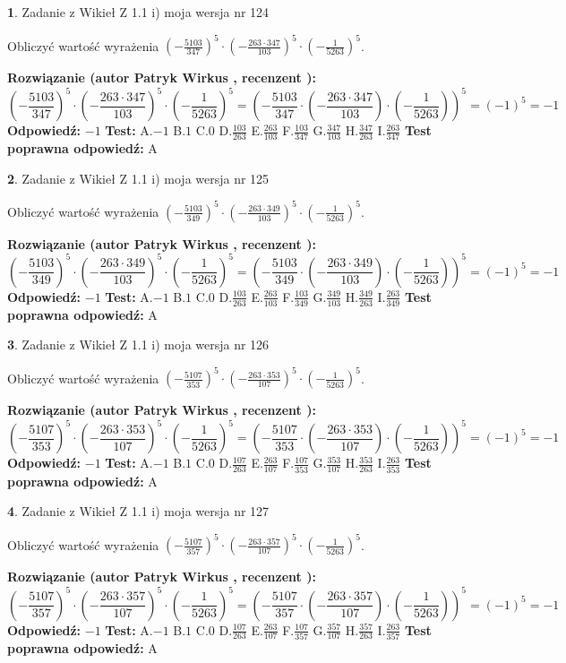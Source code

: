 \documentclass[12pt, a4paper]{article}
\theoremstyle{definition} %
\newtheorem{zad}{}
\newcommand{\zadStart}[1]{\begin{zad}#1\newline}
\newcommand{\zadStop}{\end{zad}}
\newcommand{\rozwStart}[2]{\noindent \textbf{Rozwiązanie (autor #1 , recenzent #2): }\newline}
\newcommand{\rozwStop}{\newline}
\newcommand{\odpStart}{\noindent \textbf{Odpowiedź:}\newline}
\newcommand{\odpStop}{\newline}
\newcommand{\testStart}{\noindent \textbf{Test:}\newline}
\newcommand{\testStop}{\newline}
\newcommand{\kluczStart}{\noindent \textbf{Test poprawna odpowiedź:}\newline}
\newcommand{\kluczStop}{\newline}
\begin{document}
\zadStart{Zadanie z Wikieł Z 1.1 i) moja wersja nr 124}

Obliczyć wartość wyrażenia $(-\frac{5103}{347})^{5} \cdot (-\frac{263 \cdot 347}{103})^{5} \cdot (-\frac{1}{5263})^{5}$.
\zadStop
\rozwStart{Patryk Wirkus}{}
$$(-\frac{5103}{347})^{5} \cdot (-\frac{263 \cdot 347}{103})^{5} \cdot (-\frac{1}{5263})^{5} = (-\frac{5103}{347} \cdot (-\frac{263 \cdot 347}{103}) \cdot (-\frac{1}{5263}))^{5} = (-1)^{5} = -1$$
\rozwStop
\odpStart
$-1$
\odpStop
\testStart
A.$-1$ B.$1$ C.$0$ D.$\frac{103}{263}$ E.$\frac{263}{103}$
F.$\frac{103}{347}$ G.$\frac{347}{103}$
H.$\frac{347}{263}$
I.$\frac{263}{347}$
\testStop
\kluczStart
A
\kluczStop



\zadStart{Zadanie z Wikieł Z 1.1 i) moja wersja nr 125}

Obliczyć wartość wyrażenia $(-\frac{5103}{349})^{5} \cdot (-\frac{263 \cdot 349}{103})^{5} \cdot (-\frac{1}{5263})^{5}$.
\zadStop
\rozwStart{Patryk Wirkus}{}
$$(-\frac{5103}{349})^{5} \cdot (-\frac{263 \cdot 349}{103})^{5} \cdot (-\frac{1}{5263})^{5} = (-\frac{5103}{349} \cdot (-\frac{263 \cdot 349}{103}) \cdot (-\frac{1}{5263}))^{5} = (-1)^{5} = -1$$
\rozwStop
\odpStart
$-1$
\odpStop
\testStart
A.$-1$ B.$1$ C.$0$ D.$\frac{103}{263}$ E.$\frac{263}{103}$
F.$\frac{103}{349}$ G.$\frac{349}{103}$
H.$\frac{349}{263}$
I.$\frac{263}{349}$
\testStop
\kluczStart
A
\kluczStop



\zadStart{Zadanie z Wikieł Z 1.1 i) moja wersja nr 126}

Obliczyć wartość wyrażenia $(-\frac{5107}{353})^{5} \cdot (-\frac{263 \cdot 353}{107})^{5} \cdot (-\frac{1}{5263})^{5}$.
\zadStop
\rozwStart{Patryk Wirkus}{}
$$(-\frac{5107}{353})^{5} \cdot (-\frac{263 \cdot 353}{107})^{5} \cdot (-\frac{1}{5263})^{5} = (-\frac{5107}{353} \cdot (-\frac{263 \cdot 353}{107}) \cdot (-\frac{1}{5263}))^{5} = (-1)^{5} = -1$$
\rozwStop
\odpStart
$-1$
\odpStop
\testStart
A.$-1$ B.$1$ C.$0$ D.$\frac{107}{263}$ E.$\frac{263}{107}$
F.$\frac{107}{353}$ G.$\frac{353}{107}$
H.$\frac{353}{263}$
I.$\frac{263}{353}$
\testStop
\kluczStart
A
\kluczStop



\zadStart{Zadanie z Wikieł Z 1.1 i) moja wersja nr 127}

Obliczyć wartość wyrażenia $(-\frac{5107}{357})^{5} \cdot (-\frac{263 \cdot 357}{107})^{5} \cdot (-\frac{1}{5263})^{5}$.
\zadStop
\rozwStart{Patryk Wirkus}{}
$$(-\frac{5107}{357})^{5} \cdot (-\frac{263 \cdot 357}{107})^{5} \cdot (-\frac{1}{5263})^{5} = (-\frac{5107}{357} \cdot (-\frac{263 \cdot 357}{107}) \cdot (-\frac{1}{5263}))^{5} = (-1)^{5} = -1$$
\rozwStop
\odpStart
$-1$
\odpStop
\testStart
A.$-1$ B.$1$ C.$0$ D.$\frac{107}{263}$ E.$\frac{263}{107}$
F.$\frac{107}{357}$ G.$\frac{357}{107}$
H.$\frac{357}{263}$
I.$\frac{263}{357}$
\testStop
\kluczStart
A
\kluczStop
\end{document}
